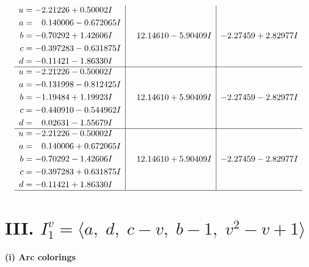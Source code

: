 \documentclass[1p]{elsarticle_modified}
\theoremstyle{definition}
\begin{document}
$$\begin{array}{c|c|c}
\begin{aligned}
u &= -2.21226 + 0.50002 I \\
a &= \phantom{-}0.140006 - 0.672065 I \\
b &= -0.70292 + 1.42606 I \\
c &= -0.397283 - 0.631875 I \\
d &= -0.11421 - 1.86330 I\end{aligned}
 & \phantom{-}12.14610 - 5.90409 I & -2.27459 + 2.82977 I \\ \hline\begin{aligned}
u &= -2.21226 - 0.50002 I \\
a &= -0.131998 - 0.812425 I \\
b &= -1.19484 + 1.19923 I \\
c &= -0.440910 - 0.544962 I \\
d &= \phantom{-}0.02631 - 1.55679 I\end{aligned}
 & \phantom{-}12.14610 + 5.90409 I & -2.27459 - 2.82977 I \\ \hline\begin{aligned}
u &= -2.21226 - 0.50002 I \\
a &= \phantom{-}0.140006 + 0.672065 I \\
b &= -0.70292 - 1.42606 I \\
c &= -0.397283 + 0.631875 I \\
d &= -0.11421 + 1.86330 I\end{aligned}
 & \phantom{-}12.14610 + 5.90409 I & -2.27459 - 2.82977 I\\
 \hline 
 \end{array}$$\newpage\newpage\renewcommand{\arraystretch}{1}
\centering \section*{III. $I^v_{1}= \langle a,\;d,\;c- v,\;b-1,\;v^2- v+1 \rangle$}
\flushleft \textbf{(i) Arc colorings}\\
\end{document}
